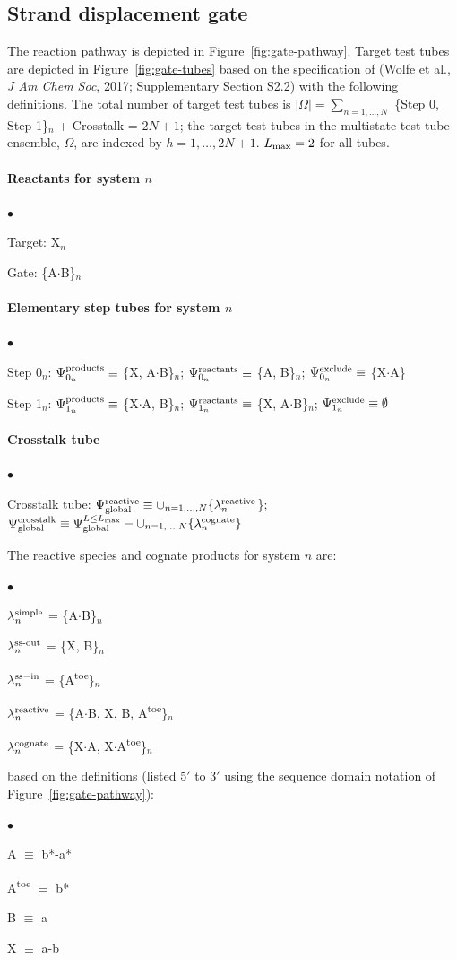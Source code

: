 \documentclass[11pt]{article}
\newcommand{\blist}{
 \begin{list}{$\bullet$}
 { \setlength{\itemsep}{2pt}
     \setlength{\parsep}{0pt}
     \setlength{\topsep}{6pt}
 } }
\newcommand{\elist}{
  \end{list}  }
\def\supsub#1#2{$^{\rm #1}_{#2}$}
\def\sub#1{$_{#1}$}
\def\super#1{\textsuperscript{#1}}
\newcommand{\plex}{$\cdot$}
\begin{document}
\subsection*{Strand displacement gate}
The reaction pathway is depicted in Figure~\ref{fig:gate-pathway}. 
Target test tubes are depicted in Figure~\ref{fig:gate-tubes} based on the specification of (Wolfe et al., {\it J Am Chem Soc}, 2017; Supplementary Section S2.2) with the following definitions. 
The total number of target test tubes is $|\Omega| = \sum_{n=1,\dots,N}$ \{Step 0, Step 1\}$_n$  + Crosstalk = $2N + 1$; 
the target test tubes in the multistate test tube ensemble, $\Omega$, are indexed by $h = 1,\dots,2N+1$. $L_{\rm max} = 2$ for 
all tubes.


\paragraph{\bf Reactants for system $n$}
\blist
\item Target: X\sub{n}
\item Gate: \{A\plex B\}\sub{n}
\elist


\paragraph{\bf Elementary step tubes for system $n$}
\blist
\item Step 0\sub{n}: $\Psi^{\rm products}_{0_n} \equiv$ \{X, A\plex B\}\sub{n}; $\Psi^{\rm reactants}_{0_n} \equiv$ \{A, B\}\sub{n};  $\Psi^{\rm exclude}_{0_n}\equiv$ \{X\plex A\}
\item Step 1$_n$: $\Psi^{\rm products}_{1_n} \equiv$ \{X\plex A, B\}$_n$; $\Psi^{\rm reactants}_{1_n} \equiv$ \{X, A\plex B\}$_n$;  $\Psi^{\rm exclude}_{1_n}\equiv \emptyset$  
\elist

\paragraph{\bf Crosstalk tube}
\blist
\item Crosstalk tube: $\Psi^{\rm reactive}_{\rm global} \equiv \cup_{n=1,\dots,N}\{\lambda_n^{\rm reactive}$\};~~$\Psi^{\rm crosstalk}_{\rm global} \equiv \Psi^{L\le L_{\rm max}}_{\rm global} - \cup_{n=1,\dots,N}\{\lambda_n^{\rm cognate}\}$
\elist
The reactive species and cognate products for system $n$ are: 
\blist
\item $\lambda$\supsub{simple}{n}  = \{A\plex B\}\sub{n}
\item $\lambda$\supsub{ss\textrm{-}out}{n}  = \{X, B\}\sub{n}
\item $\lambda$\supsub{ss-in}{n}  = \{A\super{toe}\}\sub{n}
\item $\lambda$\supsub{reactive}{n} = \{A\plex B, X, B, A\super{toe}\}\sub{n}
\item $\lambda$\supsub{cognate}{n} = \{X\plex A, X\plex A\super{toe}\}\sub{n}
\elist
based on the definitions (listed 5$'$ to 3$'$ using the sequence domain notation of Figure~\ref{fig:gate-pathway}):
\blist
\item A $\equiv$ b*-a*
\item A\super{toe} $\equiv$ b*
\item B $\equiv$ a
\item X $\equiv$ a-b
\elist
\end{document}
